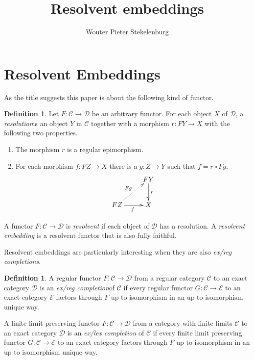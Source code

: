 \documentclass[sort&compress,draft]{elsarticle}
\theoremstyle{plain}
\theoremstyle{definition}
\newtheorem{definition}[theorem]{Definition}
\theoremstyle{remark}
\newcommand\hide[1]{}
\newcommand\key[1]{\emph{#1}\label{#1}}
\newcommand\cat\mathcal
\newcommand\of:
\begin{document}
\begin{frontmatter}
\title{Resolvent embeddings}

\author[W. P. Stekelenburg]{Wouter Pieter Stekelenburg}
\address{Faculty of Mathematics, Informatics and Mechanics,
University of Warsaw,
Banacha 2,
02-097 Warszawa,
Poland}

\begin{abstract}
\end{abstract}

\begin{keyword}
\end{keyword}


\end{frontmatter}


\section{Resolvent Embeddings}
As the title suggests this paper is about the following kind of functor.

\begin{definition} Let $F\of \cat C\to\cat D$ be an arbitrary functor. For each object $X$ of $\cat D$, a \key{resolution} is an object $Y$ in $\cat C$ together with a morphism $r:FY\to X$ with the following two properties.
\begin{enumerate} 
\item The morphism $r$ is a regular epimorphism.
\item For each morphism $f\of FZ\to X$ there is a $g\of Z\to Y$ such that $f=r\circ Fg$.
\[ \xymatrix{
& FY \ar[d]^{r} \\
FZ\ar[r]_f \ar@{.>}[ur]^{Fg} & X
}\]
\end{enumerate}
A functor $F:\cat C\to\cat D$ is \key{resolvent} if each object of $\cat D$ has a resolution. A \emph{resolvent embedding} is a resolvent functor that is also fully faithful.
\end{definition}

Resolvent embeddings are particularly interesting when they are also \emph{ex/reg completions}.

\begin{definition} A regular functor $F\of\cat C\to\cat D$ from a regular category $\cat C$ to an exact category $\cat D$ is an \key{ex/reg completion} of $\cat C$ if every regular functor $G\of \cat C\to\cat E$ to an exact category $\cat E$ factors through $F$ up to isomorphism in an up to isomorphism unique way.

A finite limit preserving functor $F\of\cat C\to\cat D$ from a category with finite limits $\cat C$ to an exact category $\cat D$ is an \key{ex/lex completion} of $\cat C$ if every finite limit preserving functor $G\of \cat C\to\cat E$ to an exact category factors through $F$ up to isomorphism in an up to isomorphism unique way.
\end{definition}\hide{It is clear that completions are fully faithful? How does this follow from the universal property?}
\end{document}
